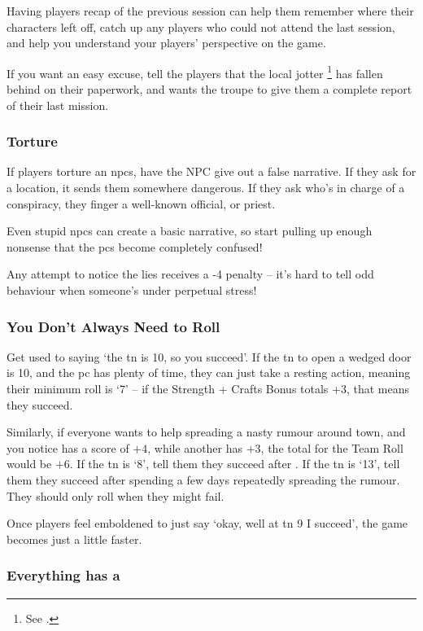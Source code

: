 \begin{multicols}{2}
Having players recap of the previous session can help them remember where their characters left off, catch up any players who could not attend the last session, and help you understand your players' perspective on the game.

If you want an easy excuse, tell the players that the local jotter%
\footnote{See .}
has fallen behind on their paperwork, and wants the troupe to give them a complete report of their last mission.

\subsubsection{Torture}

If players torture an \glspl{npc}, have the NPC give out a false narrative.
If they ask for a location, it sends them somewhere dangerous.
If they ask who's in charge of a conspiracy, they finger a well-known official, or priest.

Even stupid \glspl{npc} can create a basic narrative, so start pulling up enough nonsense that the \glspl{pc} become completely confused!

Any attempt to notice the lies receives a -4 penalty -- it's hard to tell odd behaviour when someone's under perpetual stress!

\subsubsection{You Don't Always Need to Roll}

Get used to saying `the \gls{tn} is 10, so you succeed'.
If the \gls{tn} to open a wedged door is 10, and the \gls{pc} has plenty of time, they can just take a resting action, meaning their minimum roll is `7' -- if the Strength + Crafts Bonus totals +3, that means they succeed.

Similarly, if everyone wants to help spreading a nasty rumour around town, and you notice  has a  score of $+4$, while another has $+3$, the total for the Team Roll would be $+6$.
If the \gls{tn} is `8', tell them they succeed after .
If the \gls{tn} is `13', tell them they succeed after spending a few days repeatedly spreading the rumour.
They should only roll when they might fail.

Once players feel emboldened to just say `okay, well at \gls{tn} 9 I succeed', the game becomes just a little faster.

\subsubsection{Everything has a }


\end{multicols}

